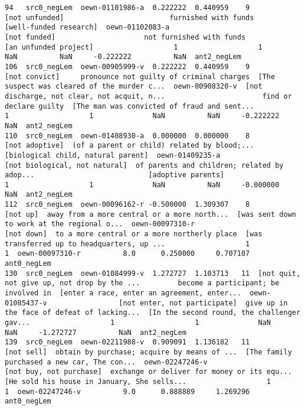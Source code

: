 \documentclass[a4paper,10pt,onecolumn,oneside,openright]{article}
\begin{document}
\begin{verbatim}
94   src0_negLem  oewn-01101986-a  0.222222  0.440959    9                               [not unfunded]                         furnished with funds                       [well-funded research]  oewn-01102083-a                                 [not funded]                     not furnished with funds                        [an unfunded project]                   1                   1              NaN          NaN     -0.222222          NaN  ant2_negLem
106  src0_negLem  oewn-00905999-v  0.222222  0.440959    9                                [not convict]     pronounce not guilty of criminal charges  [The suspect was cleared of the murder c...  oewn-00908320-v  [not discharge, not clear, not acquit, n...                       find or declare guilty  [The man was convicted of fraud and sent...                   1                   1              NaN          NaN     -0.222222          NaN  ant2_negLem
110  src0_negLem  oewn-01408930-a  0.000000  0.000000    8                               [not adoptive]  (of a parent or child) related by blood;...           [biological child, natural parent]  oewn-01409235-a                [not biological, not natural]  of parents and children; related by adop...                           [adoptive parents]                   1                   1              NaN          NaN     -0.000000          NaN  ant2_negLem
112  src0_negLem  oewn-00096162-r -0.500000  1.309307    8                                     [not up]  away from a more central or a more north...  [was sent down to work at the regional o...  oewn-00097310-r                                   [not down]  to a more central or a more northerly place  [was transferred up to headquarters, up ...                   1                   1  oewn-00097310-r          8.0      0.250000     0.707107  ant0_negLem
130  src0_negLem  oewn-01084999-v  1.272727  1.103713   11  [not quit, not give up, not drop by the ...         become a participant; be involved in  [enter a race, enter an agreement, enter...  oewn-01085437-v                 [not enter, not participate]  give up in the face of defeat of lacking...  [In the second round, the challenger gav...                   1                   1              NaN          NaN     -1.272727          NaN  ant2_negLem
139  src0_negLem  oewn-02211988-v  0.909091  1.136182   11                                   [not sell]  obtain by purchase; acquire by means of ...  [The family purchased a new car, The con...  oewn-02247246-v                      [not buy, not purchase]  exchange or deliver for money or its equ...  [He sold his house in January, She sells...                   1                   1  oewn-02247246-v          9.0      0.888889     1.269296  ant0_negLem

\end{verbatim}
\end{document}
